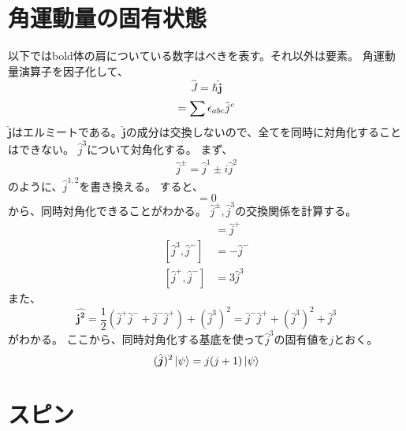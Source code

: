 \documentclass{jsarticle}
\newcommand{\half}{\frac{1}{2}}
\newcommand{\beq}{\begin{equation}}
\newcommand{\eeq}{\end{equation}}
\newcommand{\hj}{\hat{j}}
\newcommand{\hjm}{\hat{j}^{-}}
\newcommand{\hjp}{\hat{j}^{+}}
\newcommand{\hbj}{\hat{\bm{j}}}
\newcommand{\hbjt}{\hat{\bm{j^2}}}
\newcommand{\hcj}{\hat{J}}
\begin{document}
\section{角運動量の固有状態}
以下ではbold体の肩についている数字はべきを表す。それ以外は要素。
角運動量演算子を因子化して、
\beq
    \hcj = \hbar \hbj
\eeq
\beq
[\hj^a,\hj^b] = \sum \epsilon_{abc}\hj^c\\
\eeq
$\hbj$はエルミートである。$\hbj$の成分は交換しないので、全てを同時に対角化することはできない。
$\hj^3$について対角化する。
まず、
\begin{align}
    \hj^{\pm} = \hj^1 \pm i \hj^2
\end{align}
のように、$\hj^{1,2}$を書き換える。
すると、
\beq
[\hbjt,\hj^3] = 0
\eeq
から、同時対角化できることがわかる。
$\hj^{\pm},\hj^3$の交換関係を計算する。
\begin{align}
    [\hj^3, \hj^{+}] &= \hj^{+}\\
[\hj^3, \hj^{-}] &= -\hj^{-}\\
[\hj^{+}, \hj^{-}] &= 3\hj^{3}
\end{align}
また、
\beq
\hbjt = \half (\hjp\hjm + \hjm\hjp) + (\hj^3)^2 =  \hjm\hjp + (\hj^3)^2 + \hj^3
\eeq
がわかる。
ここから、同時対角化する基底を使って$\hj^3$の固有値を$j$とおく。
\beq
    (\hbj)^2 \ket{\psi} = j(j+1)\ket{\psi}
\eeq
\section{スピン}
\end{document}
